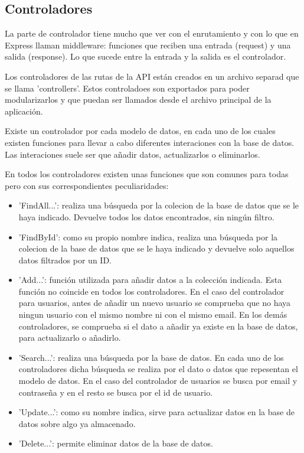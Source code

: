 \documentclass[a4paper, 12pt]{book}
\begin{document}
\subsection{Controladores} 
\label{sec:controladores}

La parte de controlador tiene mucho que ver con el enrutamiento y con lo que en Express llaman middleware: funciones que reciben una entrada (request) y una salida (response). Lo que sucede entre la entrada y la salida es el controlador.

Los controladores de las rutas de la API est\'an creados en un archivo separad que se llama 'controllers'. Estos controladoes son exportados para poder modularizarlos y que puedan ser llamados desde el archivo principal de la aplicaci\'on. 

Existe un controlador por cada modelo de datos, en cada uno de los cuales existen funciones para llevar a cabo diferentes interaciones con la base de datos. Las interaciones suele ser que a\~nadir datos, actualizarlos o eliminarlos.

En todos los controladores existen unas funciones que son comunes para todas pero con sus correspondientes peculiaridades:

\begin{itemize}
\item 'FindAll...': realiza una b\'usqueda por la colecion de la base de datos que se le haya indicado. Devuelve todos los datos encontrados, sin ning\'un filtro.

\item 'FindById': como su propio nombre indica, realiza una b\'usqueda por la colecion de la base de datos que se le haya indicado y devuelve solo aquellos datos filtrados por un ID.

\item 'Add...': funci\'on utilizada para a\~nadir datos a la colecci\'on indicada. Esta funci\'on no coincide en todos los controladores. En el caso del controlador para usuarios, antes de a\~nadir un nuevo usuario se comprueba que no haya ningun usuario con el mismo nombre ni con el mismo email. En los dem\'as controladores, se comprueba si el dato a a\~nadir ya existe en la base de datos, para actualizarlo o a\~nadirlo.

\item 'Search...': realiza una b\'usqueda por la base de datos. En cada uno de los controladores dicha b\'usqueda se realiza por el dato o datos que repesentan el modelo de datos. En el caso del controlador de usuarios se busca por email y contrase\~na y en el resto se busca por el id de usuario.

\item 'Update...': como su nombre indica, sirve para actualizar datos en la base de datos sobre algo ya almacenado.

\item 'Delete...': permite eliminar datos de la base de datos.

\end{itemize}
\end{document}
